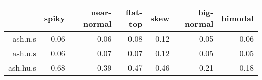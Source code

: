 \begin{tabular}{rrrrrrr}
  \toprule  & spiky & near-normal & flat-top & skew & big-normal & bimodal \\ 
  \midrule ash.n.s & 0.06 & 0.06 & 0.08 & 0.12 & 0.05 & 0.06 \\ 
  ash.u.s & 0.06 & 0.07 & 0.07 & 0.12 & 0.05 & 0.05 \\ 
  ash.hu.s & 0.68 & 0.39 & 0.47 & 0.46 & 0.21 & 0.18 \\ 
   \bottomrule \end{tabular}


